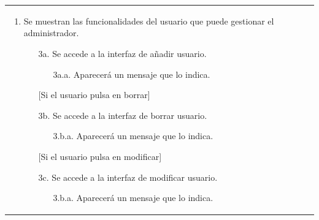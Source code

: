 \documentclass{report}
\begin{document}
\begin{center}
\begin{longtable}{|p{\linewidth}|}
\begin{enumerate}
                    \item Se muestran las funcionalidades del usuario que puede gestionar el administrador.
                        \begin{enumerate}
                            \item[3a.] Se accede a la interfaz de añadir usuario.
                            \begin{enumerate}
                                \item[3a.a.] Aparecerá un mensaje que lo indica.
                            \end{enumerate}
                    
                        [Si el usuario pulsa en borrar]
                            \item[3b.] Se accede a la interfaz de borrar usuario.
                            \begin{enumerate}
                                \item[3.b.a.] Aparecerá un mensaje que lo indica.
                            \end{enumerate}

                         [Si el usuario pulsa en modificar]
                            \item[3c.] Se accede a la interfaz de modificar usuario.
                            \begin{enumerate}
                                \item[3.b.a.] Aparecerá un mensaje que lo indica.
                            \end{enumerate}
                        \end{enumerate}
                    

\end{enumerate}
\end{longtable}
\end{center}
\end{document}
